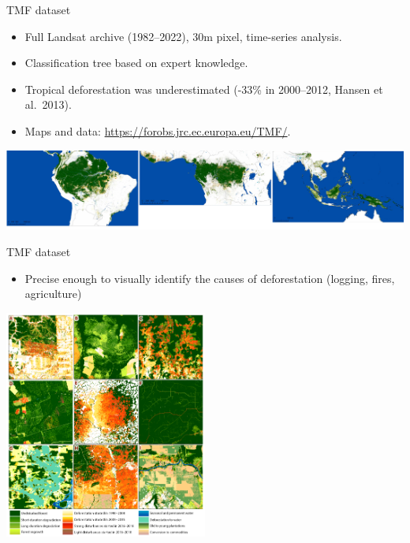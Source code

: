 \documentclass[10pt,table,dvipsnames,compress]{beamer}
\begin{document}
\begin{frame}[label={sec:org5354625}]{TMF dataset}
\begin{itemize}
\item Full Landsat archive (1982--2022), 30m pixel, time-series analysis.
\item Classification tree based on expert knowledge.
\item Tropical deforestation was underestimated (-33\% in 2000--2012, Hansen
et al. 2013).
\item Maps and data: \url{https://forobs.jrc.ec.europa.eu/TMF/}.
\end{itemize}

\vspace{0.25cm}

\begin{center}
\includegraphics[width=\textwidth]{figs/Vancutsem2021-maps-wide.png}
\end{center}
\end{frame}

\begin{frame}[label={sec:org9cc5c5f}]{TMF dataset}
\begin{itemize}
\item Precise enough to visually identify the causes of deforestation
(logging, fires, agriculture)
\end{itemize}

\begin{center}
\includegraphics[width=0.5\textwidth]{figs/Vancutsem2021-patterns.png}
\end{center}
\end{frame}
\end{document}
